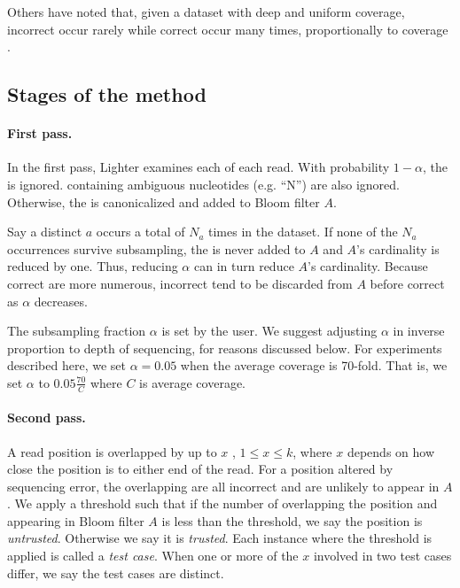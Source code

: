 \documentclass{bmcart}
\begin{document}
Others have noted that, given a dataset with deep and uniform coverage, incorrect \kmers occur rarely while correct \kmers occur many times, proportionally to coverage \cite{pevzner2001eulerian, chaisson2004fragment}.

\subsection*{Stages of the method}
\paragraph{First pass.}    In the first pass, Lighter examines each \kmer of each read.  With probability $1 - \alpha$, the \kmer is ignored.  \kmers containing ambiguous nucleotides (e.g. ``N'') are also ignored.  Otherwise, the \kmer is canonicalized and added to Bloom filter $A$.

Say a distinct \kmer $a$ occurs a total of $N_a$ times in the dataset.  If none of the $N_a$ occurrences survive subsampling, the \kmer is never added to $A$ and $A$'s cardinality is reduced by one.  Thus, reducing $\alpha$ can in turn reduce $A$'s cardinality.  Because correct \kmers are more numerous, incorrect \kmers tend to be discarded from $A$ before correct \kmers as $\alpha$ decreases.

The subsampling fraction $\alpha$ is set by the user.  We suggest adjusting $\alpha$ in inverse proportion to depth of sequencing, for reasons discussed below.  For experiments described here, we set $\alpha=0.05$ when the average coverage is 70-fold.  That is, we set $\alpha$ to $0.05\frac{70}{C}$ where $C$ is average coverage.

\paragraph{Second pass.} 
A read position is overlapped by up to $x$ \kmers, $1\le x\le k$, where $x$ depends on how close the position is to either end of the read.
For a position altered by sequencing error, the overlapping \kmers are all incorrect and are unlikely to appear in $A$.
We apply a threshold such that if the number of \kmers overlapping the position and appearing in Bloom filter $A$ is less than the threshold, we say the position is \emph{untrusted}.
Otherwise we say it is \emph{trusted}.
Each instance where the threshold is applied is called a \emph{test case}.
When one or more of the $x$ \kmers involved in two test cases differ, we say the test cases are distinct.
\end{document}
